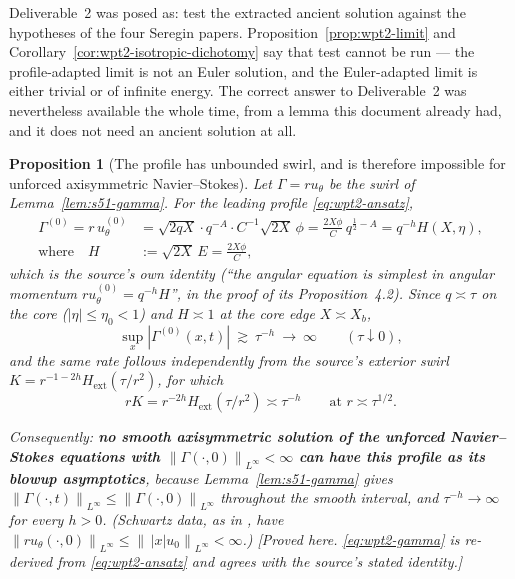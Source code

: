 \documentclass[11pt]{article}
\newtheorem{proposition}[theorem]{Proposition}
\theoremstyle{definition}
\theoremstyle{remark}
\newcommand{\norm}[1]{\left\|#1\right\|}
\newcommand{\abs}[1]{\left|#1\right|}
\begin{document}
Deliverable~2 was posed as: test the extracted ancient solution against the
hypotheses of the four Seregin papers. Proposition~\ref{prop:wpt2-limit} and
Corollary~\ref{cor:wpt2-isotropic-dichotomy} say that test cannot be run --- the
profile-adapted limit is not an Euler solution, and the Euler-adapted limit is
either trivial or of infinite energy. The correct answer to Deliverable~2 was
nevertheless available the whole time, from a lemma this document already
had, and it does not need an ancient solution at all.

\begin{proposition}[The profile has unbounded swirl, and is therefore
  impossible for unforced axisymmetric Navier--Stokes]
  \label{prop:wpt2-swirl-exclusion}
  Let $\Gamma=ru_\theta$ be the swirl of Lemma~\ref{lem:s51-gamma}. For the
  leading profile \eqref{eq:wpt2-ansatz},
  \begin{equation}\label{eq:wpt2-gamma}
    \begin{aligned}
      \Gamma^{(0)}=r\,u^{(0)}_\theta
        &=\sqrt{2qX}\cdot q^{-A}\cdot C^{-1}\sqrt{2X}\,\phi
        =\frac{2X\phi}{C}\,q^{\frac12-A}
        =q^{-h}H(X,\eta),\\
      \text{where}\quad H&:=\sqrt{2X}\,E=\frac{2X\phi}{C},
    \end{aligned}
  \end{equation}
  which is the source's own identity (``the angular equation is simplest in
  angular momentum $ru^{(0)}_\theta=q^{-h}H$'', in the proof of its
  Proposition~4.2). Since $q\asymp\tau$ on the core
  ($\abs{\eta}\leq\eta_0<1$) and $H\asymp1$ at the core edge $X\asymp X_b$,
  \[
    \sup_x\abs{\Gamma^{(0)}(x,t)}\ \gtrsim\ \tau^{-h}
      \ \longrightarrow\ \infty
    \qquad(\tau\downarrow0),
  \]
  and the same rate follows independently from the source's exterior swirl
  $K=r^{-1-2h}H_{\mathrm{ext}}(\tau/r^2)$, for which
  \[
    rK=r^{-2h}H_{\mathrm{ext}}(\tau/r^2)\asymp\tau^{-h}
    \qquad\text{at } r\asymp\tau^{1/2}.
  \]

  Consequently: \textbf{no smooth axisymmetric solution of the
  \emph{unforced} Navier--Stokes equations with
  $\norm{\Gamma(\cdot,0)}_{L^\infty}<\infty$ can have this profile as its
  blowup asymptotics}, because Lemma~\ref{lem:s51-gamma} gives
  $\norm{\Gamma(\cdot,t)}_{L^\infty}\leq\norm{\Gamma(\cdot,0)}_{L^\infty}$
  throughout the smooth interval, and $\tau^{-h}\to\infty$ for every $h>0$.
  (Schwartz data, as in \cite{Fefferman2000}, have
  $\norm{ru_{\theta}(\cdot,0)}_{L^\infty}\leq
  \norm{\,\abs{x}u_0}_{L^\infty}<\infty$.)
  \emph{[Proved here. \eqref{eq:wpt2-gamma} is re-derived from
  \eqref{eq:wpt2-ansatz} and agrees with the source's stated identity.]}
\end{proposition}
\end{document}
